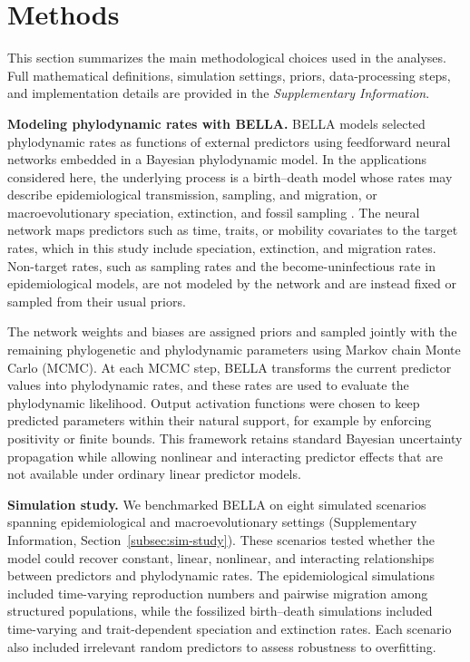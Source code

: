 \section{Methods}

This section summarizes the main methodological choices used in the analyses. Full mathematical definitions, simulation settings, priors, data-processing steps, and implementation details are provided in the \textit{Supplementary Information}.

\noindent\textbf{Modeling phylodynamic rates with BELLA.} BELLA models selected phylodynamic rates as functions of external predictors using feedforward neural networks embedded in a Bayesian phylodynamic model. In the applications considered here, the underlying process is a birth--death model whose rates may describe epidemiological transmission, sampling, and migration, or macroevolutionary speciation, extinction, and fossil sampling \citep{stadler2013uncovering,Vaughan2025BDMM,Heath2014FBD}. The neural network maps predictors such as time, traits, or mobility covariates to the target rates, which in this study include speciation, extinction, and migration rates. Non-target rates, such as sampling rates and the become-uninfectious rate in epidemiological models, are not modeled by the network and are instead fixed or sampled from their usual priors.

The network weights and biases are assigned priors and sampled jointly with the remaining phylogenetic and phylodynamic parameters using Markov chain Monte Carlo (MCMC). At each MCMC step, BELLA transforms the current predictor values into phylodynamic rates, and these rates are used to evaluate the phylodynamic likelihood. Output activation functions were chosen to keep predicted parameters within their natural support, for example by enforcing positivity or finite bounds. This framework retains standard Bayesian uncertainty propagation while allowing nonlinear and interacting predictor effects that are not available under ordinary linear predictor models.

\noindent\textbf{Simulation study.} We benchmarked BELLA on eight simulated scenarios spanning epidemiological and macroevolutionary settings (Supplementary Information, Section~\ref{subsec:sim-study}). These scenarios tested whether the model could recover constant, linear, nonlinear, and interacting relationships between predictors and phylodynamic rates. The epidemiological simulations included time-varying reproduction numbers and pairwise migration among structured populations, while the fossilized birth--death simulations included time-varying and trait-dependent speciation and extinction rates. Each scenario also included irrelevant random predictors to assess robustness to overfitting.

